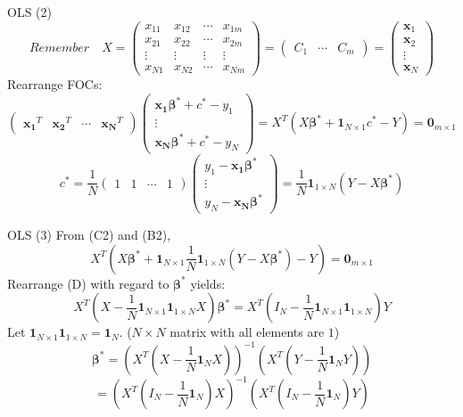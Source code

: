 \documentclass[final]{beamer}
\newcommand{\bd}{\mathbf}
\begin{document}
\begin{frame}[t]{OLS (2)}
	\[
		Remember \quad X = \begin{pmatrix}
			x_{11} & x_{12} & \cdots & x_{1m}\\
			x_{21} & x_{22} & \cdots & x_{2m}\\
			\vdots & \vdots & \vdots & \vdots\\
			x_{N1} & x_{N2} & \cdots & x_{Nm}
		\end{pmatrix}  = \begin{pmatrix}
			C_1 & \cdots & C_m
		\end{pmatrix}=\begin{pmatrix}
			\bd{x}_1 \\ \bd{x}_2 \\ \vdots \\ \bd{x}_N
		\end{pmatrix}
	\]
	Rearrange FOCs:%
	\[
		\begin{pmatrix}
			\bd{x_1}^T & \bd{x_2}^T & \cdots & \bd{x_N}^T
		\end{pmatrix}\begin{pmatrix}
			\bd{x_1}\bd{\beta^\ast}+c^\ast-y_1 \\\vdots\\\bd{x_N}\bd{\beta^\ast}+c^\ast-y_N
		\end{pmatrix} = X^T (X\bd{\beta^\ast}+\bd{1}_{N\times 1}c^\ast-Y)=\bd{0}_{m\times 1} \tag{B2}
	\]\[
		c^\ast = \frac{1}{N}\begin{pmatrix}
			1 & 1 & \cdots & 1
		\end{pmatrix}\begin{pmatrix}
			y_1 - \bd{x_1}\bd{\beta^\ast} \\\vdots\\y_N - \bd{x_N}\bd{\beta^\ast}
		\end{pmatrix}=\frac{1}{N}\bd{1}_{1\times N}(Y-X\bd{\beta^\ast})\tag{C2}
	\]
\end{frame}
\begin{frame}[t]{OLS (3)}
	From (C2) and (B2),\[
		X^T\left(X\bd{\beta^\ast}+\bd{1}_{N\times 1}\frac{1}{N}\bd{1}_{1\times N}(Y-X\bd{\beta^\ast})-Y\right) = \bd{0}_{m\times 1}\tag{D}
	\]
	Rearrange (D) with regard to $\bd{\beta^\ast}$ yields:
	\[
		X^T(X - \frac{1}{N}\bd{1}_{N\times 1}\bd{1}_{1\times N}X)\bd{\beta^\ast}= X^T(I_N-\frac{1}{N}\bd{1}_{N\times 1}\bd{1}_{1\times N})Y
	\]
	Let $\bd{1}_{N\times 1}\bd{1}_{1\times N} = \bd{1}_N$. ($N\times N$ matrix with all elements are $1$)
	\[
		\bd{\beta^\ast} = \left(X^T \left(X-\frac{1}{N}\bd{1}_{N} X\right)\right)^{-1}\left(X^T \left(Y - \frac{1}{N}\bd{1}_N Y\right)\right)
	\]\[
		=\left(X^T\left(I_N - \frac{1}{N}\bd{1}_N\right)X\right)^{-1}\left(X^T\left(I_N - \frac{1}{N}\bd{1}_N\right)Y\right)
	\]
\end{frame}
\end{document}
